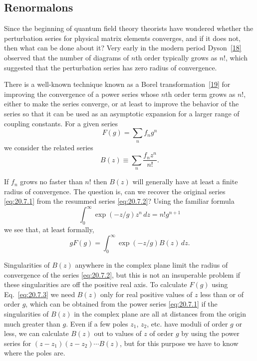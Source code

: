 
\subsection[Renormalons]{Renormalons\footnotemark}
\label{sec:20.7}

Since the beginning of quantum field theory theorists have wondered whether the perturbation series for physical matrix elements converges, and if it does not, then what can be done about it? Very early in the modern period Dyson~\hyperref[ch20-ref-18]{[18]} observed that the number of diagrams of $n$th order typically grows as $n!$, which suggested that the perturbation series has zero radius of convergence.

There is a well-known technique known as a Borel transformation~\hyperref[ch20-ref-19]{[19]} for improving the convergence of a power series whose $n$th order term grows as $n!$, either to make the series converge, or at least to improve the behavior of the series so that it can be used as an asymptotic expansion for a larger range of coupling constants. For a given series
\begin{equation}
F(g)=\sum_n f_n g^n
\tag{20.7.1}\label{eq:20.7.1}
\end{equation}
we consider the related series
\begin{equation}
B(z)\equiv\sum_n\frac{f_nz^n}{n!}.
\tag{20.7.2}\label{eq:20.7.2}
\end{equation}

If $f_n$ grows no faster than $n!$ then $B(z)$ will generally have at least a finite radius of convergence. The question is, can we recover the original series \eqref{eq:20.7.1} from the resummed series \eqref{eq:20.7.2}? Using the familiar formula
\[
\int_0^\infty \exp(-z/g)z^n\,dz=n!g^{n+1}
\]
we see that, at least formally,
\begin{equation}
gF(g)=\int_0^\infty \exp(-z/g)B(z)\,dz.
\tag{20.7.3}\label{eq:20.7.3}
\end{equation}

Singularities of $B(z)$ anywhere in the complex plane limit the radius of convergence of the series \eqref{eq:20.7.2}, but this is not an insuperable problem if these singularities are off the positive real axis. To calculate $F(g)$ using Eq.~\eqref{eq:20.7.3} we need $B(z)$ only for real positive values of $z$ less than or of order $g$, which can be obtained from the power series \eqref{eq:20.7.1} if the singularities of $B(z)$ in the complex plane are all at distances from the origin much greater than $g$. Even if a few poles $z_1$, $z_2$, etc. have moduli of order $g$ or less, we can calculate $B(z)$ out to values of $z$ of order $g$ by using the power series for $(z-z_1)(z-z_2)\cdots B(z)$, but for this purpose we have to know where the poles are.

